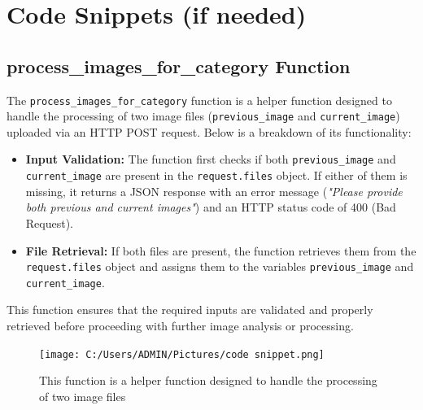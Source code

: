 \documentclass[12pt,a4paper]{report}
\begin{document}
\setlength{\baselineskip}{1.0\baselineskip}

\section{Code Snippets (if needed)}

\subsection{process\_images\_for\_category Function}
The \texttt{process\_images\_for\_category} function is a helper function designed to handle the processing of two image files (\texttt{previous\_image} and \texttt{current\_image}) uploaded via an HTTP POST request. Below is a breakdown of its functionality:

\begin{itemize}
    \item \textbf{Input Validation:} The function first checks if both \texttt{previous\_image} and \texttt{current\_image} are present in the \texttt{request.files} object. If either of them is missing, it returns a JSON response with an error message (\textit{"Please provide both previous and current images"}) and an HTTP status code of 400 (Bad Request).
    \item \textbf{File Retrieval:} If both files are present, the function retrieves them from the \texttt{request.files} object and assigns them to the variables \texttt{previous\_image} and \texttt{current\_image}.
\end{itemize}

This function ensures that the required inputs are validated and properly retrieved before proceeding with further image analysis or processing.

\begin{figure}[H]
    \centering
    \texttt{[image: C:/Users/ADMIN/Pictures/code snippet.png]} %
    \caption[Short caption for the image]{ This function is a helper function designed to handle the processing of two image files }
    \label{fig:sample_image}
\end{figure}
\end{document}

